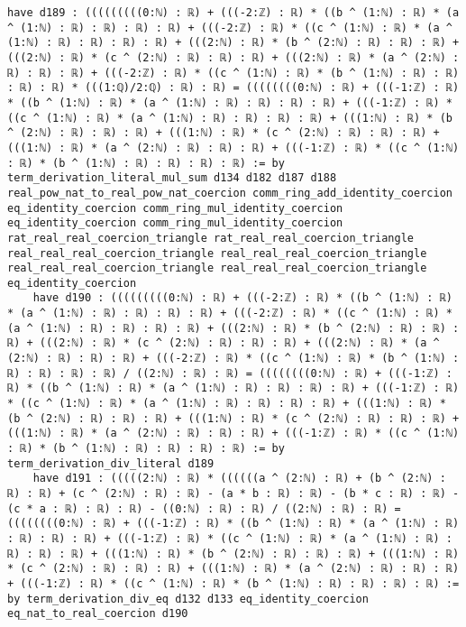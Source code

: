 \documentclass{article}
\begin{document}
\begin{tcolorbox}[colback=white!10, width=\linewidth]
\begin{lstlisting}[language=Lean4]
    have d189 : (((((((((0:ℕ) : ℝ) + (((-2:ℤ) : ℝ) * ((b ^ (1:ℕ) : ℝ) * (a ^ (1:ℕ) : ℝ) : ℝ) : ℝ) : ℝ) + (((-2:ℤ) : ℝ) * ((c ^ (1:ℕ) : ℝ) * (a ^ (1:ℕ) : ℝ) : ℝ) : ℝ) : ℝ) + (((2:ℕ) : ℝ) * (b ^ (2:ℕ) : ℝ) : ℝ) : ℝ) + (((2:ℕ) : ℝ) * (c ^ (2:ℕ) : ℝ) : ℝ) : ℝ) + (((2:ℕ) : ℝ) * (a ^ (2:ℕ) : ℝ) : ℝ) : ℝ) + (((-2:ℤ) : ℝ) * ((c ^ (1:ℕ) : ℝ) * (b ^ (1:ℕ) : ℝ) : ℝ) : ℝ) : ℝ) * (((1:ℚ)/2:ℚ) : ℝ) : ℝ) = ((((((((0:ℕ) : ℝ) + (((-1:ℤ) : ℝ) * ((b ^ (1:ℕ) : ℝ) * (a ^ (1:ℕ) : ℝ) : ℝ) : ℝ) : ℝ) + (((-1:ℤ) : ℝ) * ((c ^ (1:ℕ) : ℝ) * (a ^ (1:ℕ) : ℝ) : ℝ) : ℝ) : ℝ) + (((1:ℕ) : ℝ) * (b ^ (2:ℕ) : ℝ) : ℝ) : ℝ) + (((1:ℕ) : ℝ) * (c ^ (2:ℕ) : ℝ) : ℝ) : ℝ) + (((1:ℕ) : ℝ) * (a ^ (2:ℕ) : ℝ) : ℝ) : ℝ) + (((-1:ℤ) : ℝ) * ((c ^ (1:ℕ) : ℝ) * (b ^ (1:ℕ) : ℝ) : ℝ) : ℝ) : ℝ) := by term_derivation_literal_mul_sum d134 d182 d187 d188 real_pow_nat_to_real_pow_nat_coercion comm_ring_add_identity_coercion eq_identity_coercion comm_ring_mul_identity_coercion eq_identity_coercion comm_ring_mul_identity_coercion rat_real_real_coercion_triangle rat_real_real_coercion_triangle real_real_real_coercion_triangle real_real_real_coercion_triangle real_real_real_coercion_triangle real_real_real_coercion_triangle eq_identity_coercion
    have d190 : (((((((((0:ℕ) : ℝ) + (((-2:ℤ) : ℝ) * ((b ^ (1:ℕ) : ℝ) * (a ^ (1:ℕ) : ℝ) : ℝ) : ℝ) : ℝ) + (((-2:ℤ) : ℝ) * ((c ^ (1:ℕ) : ℝ) * (a ^ (1:ℕ) : ℝ) : ℝ) : ℝ) : ℝ) + (((2:ℕ) : ℝ) * (b ^ (2:ℕ) : ℝ) : ℝ) : ℝ) + (((2:ℕ) : ℝ) * (c ^ (2:ℕ) : ℝ) : ℝ) : ℝ) + (((2:ℕ) : ℝ) * (a ^ (2:ℕ) : ℝ) : ℝ) : ℝ) + (((-2:ℤ) : ℝ) * ((c ^ (1:ℕ) : ℝ) * (b ^ (1:ℕ) : ℝ) : ℝ) : ℝ) : ℝ) / ((2:ℕ) : ℝ) : ℝ) = ((((((((0:ℕ) : ℝ) + (((-1:ℤ) : ℝ) * ((b ^ (1:ℕ) : ℝ) * (a ^ (1:ℕ) : ℝ) : ℝ) : ℝ) : ℝ) + (((-1:ℤ) : ℝ) * ((c ^ (1:ℕ) : ℝ) * (a ^ (1:ℕ) : ℝ) : ℝ) : ℝ) : ℝ) + (((1:ℕ) : ℝ) * (b ^ (2:ℕ) : ℝ) : ℝ) : ℝ) + (((1:ℕ) : ℝ) * (c ^ (2:ℕ) : ℝ) : ℝ) : ℝ) + (((1:ℕ) : ℝ) * (a ^ (2:ℕ) : ℝ) : ℝ) : ℝ) + (((-1:ℤ) : ℝ) * ((c ^ (1:ℕ) : ℝ) * (b ^ (1:ℕ) : ℝ) : ℝ) : ℝ) : ℝ) := by term_derivation_div_literal d189
    have d191 : (((((2:ℕ) : ℝ) * ((((((a ^ (2:ℕ) : ℝ) + (b ^ (2:ℕ) : ℝ) : ℝ) + (c ^ (2:ℕ) : ℝ) : ℝ) - (a * b : ℝ) : ℝ) - (b * c : ℝ) : ℝ) - (c * a : ℝ) : ℝ) : ℝ) - ((0:ℕ) : ℝ) : ℝ) / ((2:ℕ) : ℝ) : ℝ) = ((((((((0:ℕ) : ℝ) + (((-1:ℤ) : ℝ) * ((b ^ (1:ℕ) : ℝ) * (a ^ (1:ℕ) : ℝ) : ℝ) : ℝ) : ℝ) + (((-1:ℤ) : ℝ) * ((c ^ (1:ℕ) : ℝ) * (a ^ (1:ℕ) : ℝ) : ℝ) : ℝ) : ℝ) + (((1:ℕ) : ℝ) * (b ^ (2:ℕ) : ℝ) : ℝ) : ℝ) + (((1:ℕ) : ℝ) * (c ^ (2:ℕ) : ℝ) : ℝ) : ℝ) + (((1:ℕ) : ℝ) * (a ^ (2:ℕ) : ℝ) : ℝ) : ℝ) + (((-1:ℤ) : ℝ) * ((c ^ (1:ℕ) : ℝ) * (b ^ (1:ℕ) : ℝ) : ℝ) : ℝ) : ℝ) := by term_derivation_div_eq d132 d133 eq_identity_coercion eq_nat_to_real_coercion d190

\end{lstlisting}
\end{tcolorbox}
\end{document}

